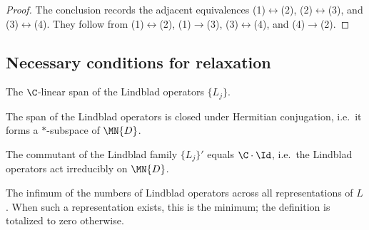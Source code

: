 \begin{proof}\leanok
    The conclusion records the adjacent equivalences
    (1)$\leftrightarrow$(2), (2)$\leftrightarrow$(3), and
    (3)$\leftrightarrow$(4).  They follow from
    (1)$\leftrightarrow$(2), (1)$\to$(3),
    (3)$\leftrightarrow$(4), and (4)$\to$(2).
\end{proof}


\subsection{Necessary conditions for relaxation}
\label{sec:cor_7_2_sufficient_conditions}

\begin{definition}\label{def:lindblad_span}
    \leanok
    The $\C$-linear span of the Lindblad operators $\{L_j\}$.
\end{definition}

\begin{definition}\label{def:is_lindblad_span_hermitian_closed}
    \leanok
    The span of the Lindblad operators is closed under Hermitian conjugation,
    i.e.\ it forms a $*$-subspace of $\MN{D}$.
\end{definition}

\begin{definition}\label{def:has_lindblad_span_trivial_commutant}
    \leanok
    The commutant of the Lindblad family $\{L_j\}'$ equals $\C\cdot\Id$,
    i.e.\ the Lindblad operators act irreducibly on $\MN{D}$.
\end{definition}

\begin{definition}\label{def:kossakowski_rank}
    \leanok
    The infimum of the numbers of Lindblad operators across all
    representations of $L$.  When such a representation exists, this is the
    minimum; the definition is totalized to zero otherwise.
\end{definition}


